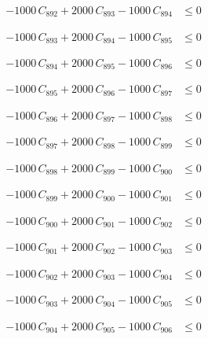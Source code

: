 \documentclass[a4paper,11pt]{article}
\begin{document}
\begin{align}
-1000\,C_{892} + 2000\,C_{893} - 1000\,C_{894} &\leq 0 \nonumber
\end{align}

\begin{align}
-1000\,C_{893} + 2000\,C_{894} - 1000\,C_{895} &\leq 0 \nonumber
\end{align}

\begin{align}
-1000\,C_{894} + 2000\,C_{895} - 1000\,C_{896} &\leq 0 \nonumber
\end{align}

\begin{align}
-1000\,C_{895} + 2000\,C_{896} - 1000\,C_{897} &\leq 0 \nonumber
\end{align}

\begin{align}
-1000\,C_{896} + 2000\,C_{897} - 1000\,C_{898} &\leq 0 \nonumber
\end{align}

\begin{align}
-1000\,C_{897} + 2000\,C_{898} - 1000\,C_{899} &\leq 0 \nonumber
\end{align}

\begin{align}
-1000\,C_{898} + 2000\,C_{899} - 1000\,C_{900} &\leq 0 \nonumber
\end{align}

\begin{align}
-1000\,C_{899} + 2000\,C_{900} - 1000\,C_{901} &\leq 0 \nonumber
\end{align}

\begin{align}
-1000\,C_{900} + 2000\,C_{901} - 1000\,C_{902} &\leq 0 \nonumber
\end{align}

\begin{align}
-1000\,C_{901} + 2000\,C_{902} - 1000\,C_{903} &\leq 0 \nonumber
\end{align}

\begin{align}
-1000\,C_{902} + 2000\,C_{903} - 1000\,C_{904} &\leq 0 \nonumber
\end{align}

\begin{align}
-1000\,C_{903} + 2000\,C_{904} - 1000\,C_{905} &\leq 0 \nonumber
\end{align}

\begin{align}
-1000\,C_{904} + 2000\,C_{905} - 1000\,C_{906} &\leq 0 \nonumber
\end{align}
\end{document}
